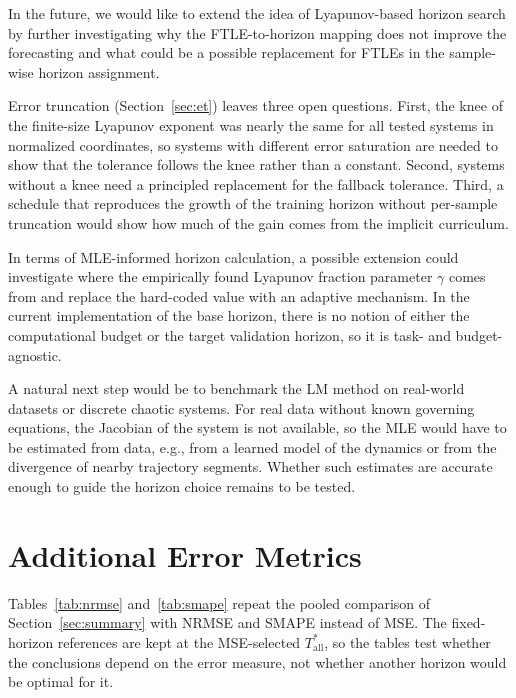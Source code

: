 \documentclass{article}
\begin{document}
In the future, we would like to extend the idea of Lyapunov-based horizon search by further investigating why the FTLE-to-horizon mapping does not improve the forecasting and what could be a possible replacement for FTLEs in the sample-wise horizon assignment.

Error truncation (Section~\ref{sec:et}) leaves three open questions. First, the knee of the finite-size Lyapunov exponent was nearly the same for all tested systems in normalized coordinates, so systems with different error saturation are needed to show that the tolerance follows the knee rather than a constant. Second, systems without a knee need a principled replacement for the fallback tolerance. Third, a schedule that reproduces the growth of the training horizon without per-sample truncation would show how much of the gain comes from the implicit curriculum.

In terms of MLE-informed horizon calculation, a possible extension could investigate where the empirically found Lyapunov fraction parameter $\gamma$ comes from and replace the hard-coded value with an adaptive mechanism. In the current implementation of the base horizon, there is no notion of either the computational budget or the target validation horizon, so it is task- and budget-agnostic.

A natural next step would be to benchmark the LM method on real-world datasets or discrete chaotic systems. For real data without known governing equations, the Jacobian of the system is not available, so the MLE would have to be estimated from data, e.g., from a learned model of the dynamics or from the divergence of nearby trajectory segments. Whether such estimates are accurate enough to guide the horizon choice remains to be tested.

\clearpage



\clearpage
\appendix

\section{Additional Error Metrics}
\label{app:metrics}




Tables~\ref{tab:nrmse} and~\ref{tab:smape} repeat the pooled comparison of Section~\ref{sec:summary} with NRMSE and SMAPE instead of MSE. The fixed-horizon references are kept at the MSE-selected $T^*_{\mathrm{all}}$, so the tables test whether the conclusions depend on the error measure, not whether another horizon would be optimal for it.
\end{document}
